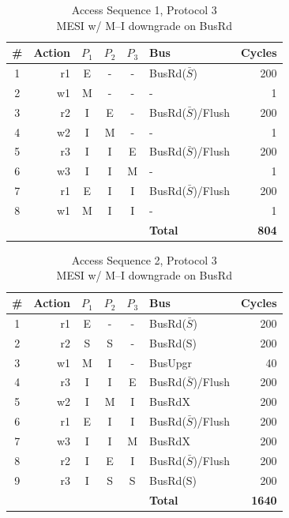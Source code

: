 \documentclass[12pt, letterpaper]{report}
\begin{document}
\begin{table}[H]
	\setlength{\extrarowheight}{.5ex}
	\centering
	\begin{tabular}{ |c|r|c|c|c|l|r| }
		\hline
		\textbf{\#} & \textbf{Action} & \textbf{$P_1$} & \textbf{$P_{2}$} & \textbf{$P_3$} & \textbf{Bus} & \textbf{Cycles} \\
		\hline
		1 & r1 & E & - & - & BusRd($\bar{S}$) & 200 \\
		\hline
		2 & w1 & M & - & - & - & 1 \\
		\hline
		3 & r2 & I & E & - & BusRd($\bar{S}$)/Flush & 200 \\
		\hline
		4 & w2 & I & M & - & - & 1 \\
		\hline
		5 & r3 & I & I & E & BusRd($\bar{S}$)/Flush & 200 \\
		\hline
		6 & w3 & I & I & M & - & 1 \\
		\hline
		7 & r1 & E & I & I & BusRd($\bar{S}$)/Flush & 200 \\
		\hline
		8 & w1 & M & I & I & - & 1 \\
		\hline \hline \hline
		\cellcolor{null} & \cellcolor{null} & \cellcolor{null} & \cellcolor{null} & \cellcolor{null} & \textbf{Total} & \textbf{804} \\
		\hline
	\end{tabular}
	\caption{Access Sequence 1, Protocol 3\\MESI w/ M--I downgrade on BusRd}
\end{table}


\begin{table}[H]
	\setlength{\extrarowheight}{.5ex}
	\centering
	\begin{tabular}{ |c|r|c|c|c|l|r| }
		\hline
		\textbf{\#} & \textbf{Action} & \textbf{$P_1$} & \textbf{$P_{2}$} & \textbf{$P_3$} & \textbf{Bus} & \textbf{Cycles} \\
		\hline
		1 & r1 & E & - & - & BusRd($\bar{S}$) & 200 \\
		\hline
		2 & r2 & S & S & - & BusRd(S) & 200 \\
		\hline
		3 & w1 & M & I & - & BusUpgr & 40 \\
		\hline
		4 & r3 & I & I & E & BusRd($\bar{S}$)/Flush & 200 \\
		\hline
		5 & w2 & I & M & I & BusRdX & 200 \\
		\hline
		6 & r1 & E & I & I & BusRd($\bar{S}$)/Flush & 200 \\
		\hline
		7 & w3 & I & I & M & BusRdX & 200 \\
		\hline
		8 & r2 & I & E & I & BusRd($\bar{S}$)/Flush & 200 \\
		\hline
		9 & r3 & I & S & S & BusRd(S) & 200 \\
		\hline \hline \hline
		\cellcolor{null} & \cellcolor{null} & \cellcolor{null} & \cellcolor{null} & \cellcolor{null} & \textbf{Total} & \textbf{1640} \\
		\hline
	\end{tabular}
	\caption{Access Sequence 2, Protocol 3\\MESI w/ M--I downgrade on BusRd}
\end{table}
\end{document}
